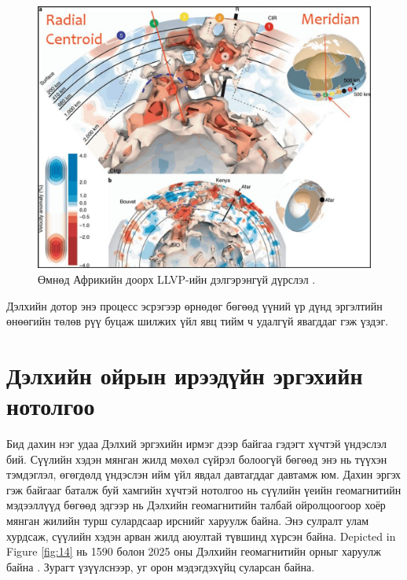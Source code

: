\documentclass[10pt,twocolumn,letterpaper]{article}
\begin{document}
\begin{figure}[t]
\begin{center}
   \includegraphics[width=1\linewidth]{llvp.jpg}
\end{center}
   \caption{Өмнөд Африкийн доорх LLVP-ийн дэлгэрэнгүй дүрслэл \cite{28}.}
\label{fig:12}
\label{fig:onecol}
\end{figure}


Дэлхийн дотор энэ процесс эсрэгээр өрнөдөг бөгөөд үүний үр дүнд эргэлтийн өнөөгийн төлөв рүү буцаж шилжих үйл явц тийм ч удалгүй явагддаг гэж үздэг.

\section{Дэлхийн ойрын ирээдүйн эргэхийн нотолгоо}

Бид дахин нэг удаа Дэлхий эргэхийн ирмэг дээр байгаа гэдэгт хүчтэй үндэслэл бий. Сүүлийн хэдэн мянган жилд мөхөл сүйрэл болоогүй бөгөөд энэ нь түүхэн тэмдэглэл, өгөгдөлд үндэслэн ийм үйл явдал давтагддаг давтамж юм. Дахин эргэх гэж байгааг баталж буй хамгийн хүчтэй нотолгоо нь сүүлийн үеийн геомагнитийн мэдээллүүд бөгөөд эдгээр нь Дэлхийн геомагнитийн талбай ойролцоогоор хоёр мянган жилийн турш сулардсаар ирснийг харуулж байна. Энэ сулралт улам хурдсаж, сүүлийн хэдэн арван жилд аюултай түвшинд хүрсэн байна.
Depicted in Figure \ref{fig:14} нь 1590 болон 2025 оны Дэлхийн геомагнитийн орныг харуулж байна \cite{125,126}. Зурагт үзүүлснээр, уг орон мэдэгдэхүйц суларсан байна.
\end{document}

